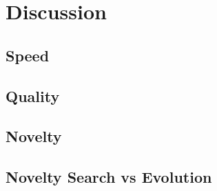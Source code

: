 \chapter{Discussion}
\label{discussion}

\section{Speed}
\section{Quality}
\section{Novelty}
\section{Novelty Search vs Evolution}
